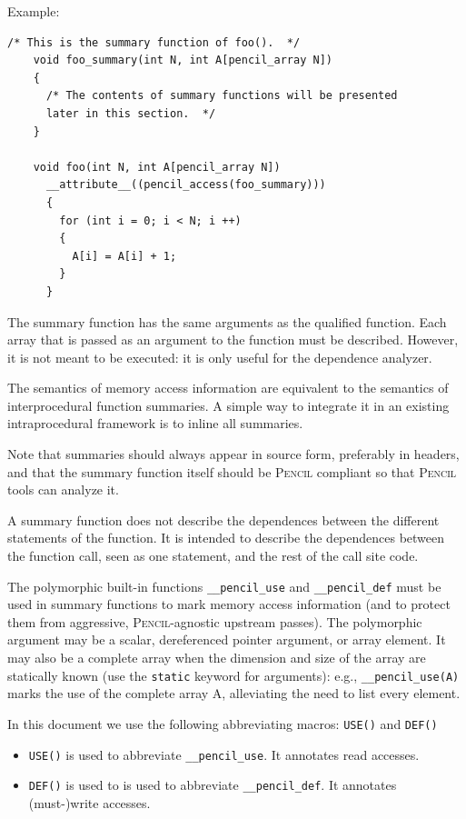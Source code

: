 \documentclass{carp}
\newcommand\pencil{\textsc{Pencil}\xspace}
\begin{document}
\begin{description}
  Example:
  \begin{lstlisting}[language=pencil]
    /* This is the summary function of foo().  */
    void foo_summary(int N, int A[pencil_array N])
    {
      /* The contents of summary functions will be presented
      later in this section.  */
    }

    void foo(int N, int A[pencil_array N])
      __attribute__((pencil_access(foo_summary)))
      {
        for (int i = 0; i < N; i ++)
        {
          A[i] = A[i] + 1;
        }
      }
  \end{lstlisting}
  
  The summary function has the same arguments as the
  qualified function.  Each array that is passed as an argument to the
  function must be described.
  However, it is not meant to be executed: it is only
  useful for the dependence analyzer.
  
  The semantics of
  memory access information are equivalent to the semantics
  of interprocedural function summaries.  A simple way to integrate
  it in an existing intraprocedural framework is to inline all
  summaries.

  Note that summaries should always appear in source form,
  preferably in headers, and that the summary function itself
  should be \pencil compliant so that \pencil tools can
  analyze it.
  
  A summary function does not describe the dependences between the
  different statements of the function.  It is intended to describe
  the dependences between the function call, seen as one statement,
  and the rest of the call site code.

  The polymorphic built-in functions \lstinline!__pencil_use!
  and \lstinline!__pencil_def! must be used in summary
  functions to mark memory access information (and to protect them
  from aggressive, \pencil-agnostic upstream passes). The
  polymorphic argument may be a scalar,
  dereferenced pointer argument, or array element. It may also be a
  complete array when the dimension and size of the array are
  statically known (use the \lstinline!static! keyword for
  arguments): e.g., \lstinline!__pencil_use(A)! marks the use of the
  complete array A, alleviating the need to list every
  element.

  In this document we use the following abbreviating macros:
  \lstinline!USE()! and \lstinline!DEF()!
  \begin{itemize}
   \item \lstinline!USE()! is used to abbreviate \lstinline!__pencil_use!.
         It annotates read accesses.
   \item \lstinline!DEF()! is used to is used to abbreviate \lstinline!__pencil_def!.
         It annotates (must-)write accesses.
  \end{itemize}


\end{description}
\end{document}
